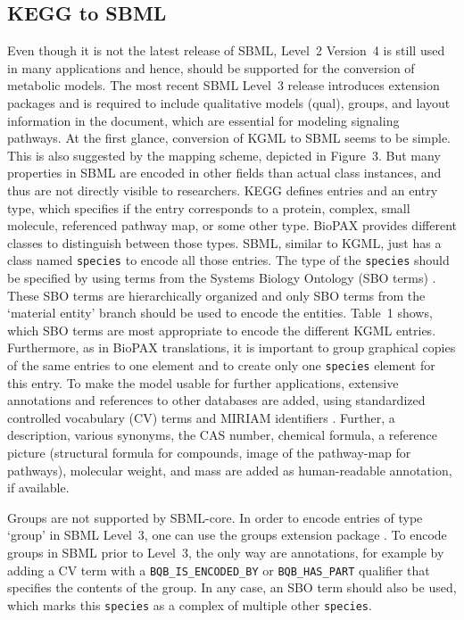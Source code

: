 \documentclass[10pt]{bmc_article}
\newenvironment{bmcformat}{\baselineskip20pt\sloppy\setboolean{publ}{false}}{\baselineskip20pt\sloppy}
\newcommand{\species}{\texttt{species}}
\begin{document}
\begin{bmcformat}
\subsection*{KEGG to SBML}

Even though it is not the latest release of SBML, Level~2 Version~4 is still used in many applications and hence, should be supported for the conversion of metabolic models. The most recent SBML Level~3 release introduces extension packages and is required to include qualitative models (qual), groups, and layout information in the document, which are essential for modeling signaling pathways.
%
At the first glance, conversion of KGML to SBML seems to be simple. This is also suggested by the mapping scheme, depicted in Figure~3. But many properties in SBML are encoded in other fields than actual class instances, and thus are not directly visible to researchers. KEGG defines entries and an entry type, which specifies if the entry corresponds to a protein, complex, small molecule, referenced pathway map, or some other type. BioPAX provides different classes to distinguish between those types. SBML, similar to KGML, just has a class named \species{} to encode all those entries. The type of the \species{} should be specified by using terms from the Systems Biology Ontology (SBO terms) \cite{SBO}. These SBO terms are hierarchically organized and only SBO terms from the `material entity' branch should be used to encode the entities. Table~1 shows, which SBO terms are most appropriate to encode the different KGML entries. Furthermore, as in BioPAX translations, it is important to group graphical copies of the same entries to one element and to create only one \species{} element for this entry.
To make the model usable for further applications, extensive annotations and references to other databases are added, using standardized controlled vocabulary (CV) terms and MIRIAM identifiers \cite{Juty2012,Novere2005}. Further, a description, various synonyms, the CAS number, chemical formula, a reference picture (structural formula for compounds, image of the pathway-map for pathways), molecular weight, and mass are added as human-readable annotation, if available.

Groups are not supported by SBML-core. In order to encode entries of type `group' in SBML Level~3, one can use the groups extension package \cite{SBMLgroups}. To encode groups in SBML prior to Level~3, the only way are annotations, for example by adding a CV term with a \texttt{BQB\_IS\_ENCODED\_BY} or \texttt{BQB\_HAS\_PART} qualifier that specifies the contents of the group. In any case, an SBO term should also be used, which marks this \species{} as a complex of multiple other \species{}.


\end{bmcformat}
\end{document}
